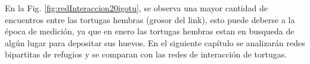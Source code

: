 En la Fig. \ref{fig:redInteraccion20igotu}, se observa una mayor cantidad de encuentros entre las tortugas hembras (grosor del link), esto puede deberse a la época de medición, ya que en enero las tortugas hembras estan en busqueda de algún lugar para depositar sus huevos. En el siguiente capítulo se analizarán redes bipartitas de refugios y se comparan con las redes de interacción de tortugas.
 
 
 
 

